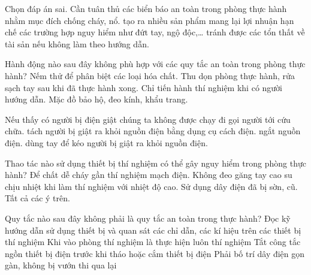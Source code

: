 \begin{ex}
Chọn đáp án sai. Cần tuân thủ các biển báo an toàn trong phòng thực hành nhằm mục đích
\choice
{chống cháy, nổ.}
{\True tạo ra nhiều sản phẩm mang lại lợi nhuận}
{hạn chế các trường hợp nguy hiểm như đứt tay, ngộ độc,…}
{tránh được các tổn thất về tài sản nếu không làm theo hướng dẫn.}
\end{ex}

\begin{ex}
Hành động nào sau đây không phù hợp với các quy tắc an toàn trong phòng thực hành?
\choice
{\True Nếm thử để phân biệt các loại hóa chất.}
{Thu dọn phòng thực hành, rửa sạch tay sau khi đã thực hành xong.}
{Chỉ tiến hành thí nghiệm khi có người hướng dẫn.}
{Mặc đồ bảo hộ, đeo kính, khẩu trang.}
\end{ex}

\begin{ex}
Nếu thấy có người bị điện giật chúng ta không được
\choice
{chạy đi gọi người tới cứu chữa.}
{tách người bị giật ra khỏi nguồn điện bằng dụng cụ cách điện.}
{ngắt nguồn điện.}
{\True dùng tay để kéo người bị giật ra khỏi nguồn điện.}
\end{ex}

\begin{ex}
Thao tác nào sử dụng thiết bị thí nghiệm có thể gây nguy hiểm trong phòng thực hành?
\choice
{Để chất dễ cháy gần thí nghiệm mạch điện.}
{Không đeo găng tay cao su chịu nhiệt khi làm thí nghiệm với nhiệt độ cao.}
{Sử dụng dây điện đã bị sờn, cũ.}
{\True Tất cả các ý trên.}
\end{ex}

\begin{ex}
Quy tắc nào sau đây không phải là quy tắc an toàn trong thực hành?
\choice
{Đọc kỹ hướng dẫn sử dụng thiết bị và quan sát các chỉ dẫn, các kí hiệu trên các thiết bị thí nghiệm}
{\True Khi vào phòng thí nghiệm là thực hiện luôn thí nghiệm}
{Tắt công tắc ngồn thiết bị điện trước khi tháo hoặc cắm thiết bị điện}
{Phải bố trí dây điện gọn gàn, không bị vướn thi qua lại}
\end{ex}

